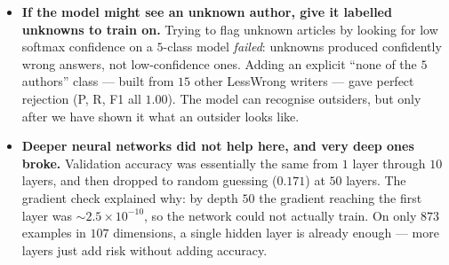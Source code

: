 \documentclass[11pt]{article}
\begin{document}
\begin{itemize}
  \item \textbf{If the model might see an unknown author, give it
        labelled unknowns to train on.} Trying to flag unknown articles
        by looking for low softmax confidence on a $5$-class model
        \emph{failed}: unknowns produced confidently wrong answers, not
        low-confidence ones. Adding an explicit ``none of the $5$
        authors'' class --- built from $15$ other LessWrong writers ---
        gave perfect rejection (P, R, F1 all $1.00$). The model can
        recognise outsiders, but only after we have shown it what an
        outsider looks like.

  \item \textbf{Deeper neural networks did not help here, and very deep
        ones broke.} Validation accuracy was essentially the same from
        $1$ layer through $10$ layers, and then dropped to random
        guessing ($0.171$) at $50$ layers. The gradient check explained
        why: by depth $50$ the gradient reaching the first layer was
        $\sim 2.5 \times 10^{-10}$, so the network could not actually
        train. On only $873$ examples in $107$ dimensions, a single
        hidden layer is already enough --- more layers just add risk
        without adding accuracy.
\end{itemize}
\end{document}
